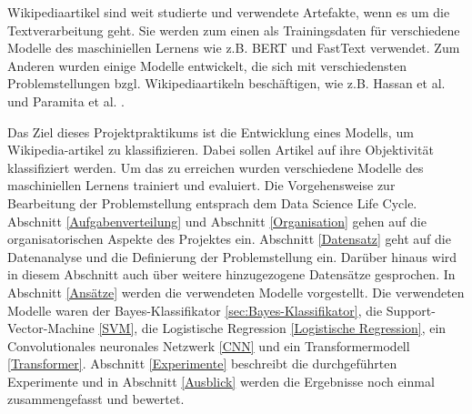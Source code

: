Wikipediaartikel sind weit studierte und verwendete Artefakte, wenn es um die Textverarbeitung geht. Sie werden zum einen als Trainingsdaten für verschiedene Modelle des maschiniellen Lernens wie z.B. BERT \cite{BERTReference} und FastText \cite{DBLP:journals/corr/BojanowskiGJM16} verwendet. Zum Anderen wurden einige Modelle entwickelt, die sich mit verschiedensten Problemstellungen bzgl. Wikipediaartikeln beschäftigen, wie z.B. Hassan et al. \cite{shavarani2020multiclassmultilingualclassificationwikipedia} und Paramita et al. \cite{das2024languageagnosticmodelingwikipediaarticles}. 

Das Ziel dieses Projektpraktikums ist die Entwicklung eines Modells, um Wikipedia-artikel zu klassifizieren. Dabei sollen Artikel auf ihre Objektivität klassifiziert werden. Um das zu erreichen wurden verschiedene Modelle des maschiniellen Lernens trainiert und evaluiert. Die Vorgehensweise zur Bearbeitung der Problemstellung entsprach dem Data Science Life Cycle. Abschnitt \ref{Aufgabenverteilung} und Abschnitt \ref{Organisation} gehen auf die organisatorischen Aspekte des Projektes ein. Abschnitt \ref{Datensatz} geht auf die Datenanalyse und die Definierung der Problemstellung ein. Darüber hinaus wird in diesem Abschnitt auch über weitere hinzugezogene Datensätze gesprochen. In Abschnitt \ref{Ansätze} werden die verwendeten Modelle vorgestellt. Die verwendeten Modelle waren der Bayes-Klassifikator \ref{sec:Bayes-Klassifikator}, die Support-Vector-Machine \ref{SVM}, die Logistische Regression \ref{Logistische Regression}, ein Convolutionales neuronales Netzwerk \ref{CNN} und ein Transformermodell \ref{Transformer}. Abschnitt \ref{Experimente} beschreibt die durchgeführten Experimente und in Abschnitt \ref{Ausblick} werden die Ergebnisse noch einmal zusammengefasst und bewertet.

